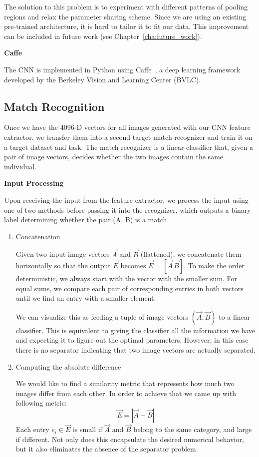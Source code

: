 The solution to this problem is to experiment with different patterns of pooling
regions and relax the parameter sharing scheme. Since we are using an existing
pre-trained architecture, it is hard to tailor it to fit our data. This improvement
can be included in future work (see Chapter~\ref{cha:future_work}).

\textbf{Caffe}

The CNN is implemented in Python using Caffe~\cite{caffe}, a deep learning
framework developed by the Berkeley Vision and Learning Center (BVLC).

\subsection{Match Recognition}

Once we have the 4096-D vectors for all images generated with our CNN feature
extractor, we transfer them into a second target match recognizer and train it
on a target dataset and task. The match recognizer is a linear classifier that,
given a pair of image vectors, decides whether the two images contain the same
individual.

\textbf{Input Processing}

Upon receiving the input from the feature extractor, we process the input using
one of two methods before passing it into the recognizer, which outputs a
binary label determining whether the pair (A, B) is a match.

\begin{enumerate}
\item Concatenation

Given two input image vectors $\vec{A}$ and $\vec{B}$ (flattened), we
concatenate them horizontally so that the output $\vec{E}$ becomes $\vec{E} =
[ \vec{A}\, \vec{B} ]$. To make the order deterministic, we always start with
the vector with the smaller sum. For equal sums, we compare each pair of
corresponding entries in both vectors until we find an entry with a smaller
element.

We can visualize this as feeding a tuple of image vectors $(\vec{A}, \vec{B})$
to a linear classifier. This is equivalent to giving the classifier all the
information we have and expecting it to figure out the optimal parameters.
However, in this case there is no separator indicating that two image vectors
are actually separated.

\item Computing the absolute difference

We would like to find a similarity metric that represents how much two images
differ from each other. In order to achieve that we came up with following
metric:
$$\vec{E} = |\vec{A} - \vec{B}|$$
Each entry $e_i \in \vec{E}$ is
small if $\vec{A}$ and $\vec{B}$ belong to the same category, and large if
different.  Not only does this encapsulate the desired numerical behavior, but it
also eliminates the absence of the separator problem.
  
\end{enumerate}

